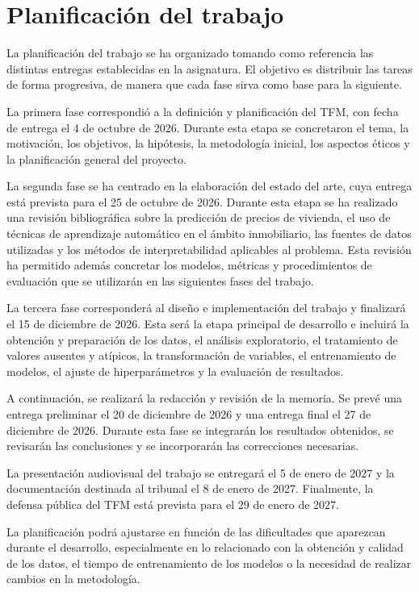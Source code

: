 \documentclass[IB]{TFUOC}%
\begin{document}
\section{Planificación del trabajo}

La planificación del trabajo se ha organizado tomando como referencia las distintas entregas establecidas en la asignatura. El objetivo es distribuir las tareas de forma progresiva, de manera que cada fase sirva como base para la siguiente.

La primera fase correspondió a la definición y planificación del TFM, con fecha de entrega el 4 de octubre de 2026. Durante esta etapa se concretaron el tema, la motivación, los objetivos, la hipótesis, la metodología inicial, los aspectos éticos y la planificación general del proyecto.

La segunda fase se ha centrado en la elaboración del estado del arte, cuya entrega está prevista para el 25 de octubre de 2026. Durante esta etapa se ha realizado una revisión bibliográfica sobre la predicción de precios de vivienda, el uso de técnicas de aprendizaje automático en el ámbito inmobiliario, las fuentes de datos utilizadas y los métodos de interpretabilidad aplicables al problema. Esta revisión ha permitido además concretar los modelos, métricas y procedimientos de evaluación que se utilizarán en las siguientes fases del trabajo.

La tercera fase corresponderá al diseño e implementación del trabajo y finalizará el 15 de diciembre de 2026. Esta será la etapa principal de desarrollo e incluirá la obtención y preparación de los datos, el análisis exploratorio, el tratamiento de valores ausentes y atípicos, la transformación de variables, el entrenamiento de modelos, el ajuste de hiperparámetros y la evaluación de resultados.

A continuación, se realizará la redacción y revisión de la memoria. Se prevé una entrega preliminar el 20 de diciembre de 2026 y una entrega final el 27 de diciembre de 2026. Durante esta fase se integrarán los resultados obtenidos, se revisarán las conclusiones y se incorporarán las correcciones necesarias.

La presentación audiovisual del trabajo se entregará el 5 de enero de 2027 y la documentación destinada al tribunal el 8 de enero de 2027. Finalmente, la defensa pública del TFM está prevista para el 29 de enero de 2027.

La planificación podrá ajustarse en función de las dificultades que aparezcan durante el desarrollo, especialmente en lo relacionado con la obtención y calidad de los datos, el tiempo de entrenamiento de los modelos o la necesidad de realizar cambios en la metodología.
\end{document}

